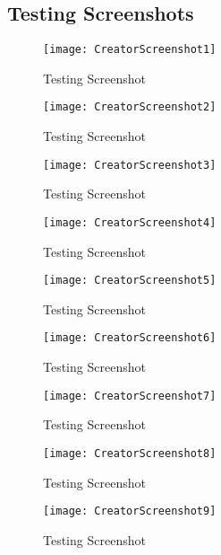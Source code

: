 \documentclass[a4paper, 11pt]{article}
\begin{document}
\begin{appendix}

\section{Testing Screenshots}

\begin{multicols}{2}

\begin{figure}[H]
\centering
\texttt{[image: CreatorScreenshot1]}
\caption{Testing Screenshot}
\label{CreatorScreenshot1}
\end{figure}

\begin{figure}[H]
\centering
\texttt{[image: CreatorScreenshot2]}
\caption{Testing Screenshot}
\label{CreatorScreenshot2}
\end{figure}

\begin{figure}[H]
\centering
\texttt{[image: CreatorScreenshot3]}
\caption{Testing Screenshot}
\label{CreatorScreenshot3}
\end{figure}

\begin{figure}[H]
\centering
\texttt{[image: CreatorScreenshot4]}
\caption{Testing Screenshot}
\label{CreatorScreenshot4}
\end{figure}

\begin{figure}[H]
\centering
\texttt{[image: CreatorScreenshot5]}
\caption{Testing Screenshot}
\label{CreatorScreenshot5}
\end{figure}

\begin{figure}[H]
\centering
\texttt{[image: CreatorScreenshot6]}
\caption{Testing Screenshot}
\label{CreatorScreenshot6}
\end{figure}

\begin{figure}[H]
\centering
\texttt{[image: CreatorScreenshot7]}
\caption{Testing Screenshot}
\label{CreatorScreenshot7}
\end{figure}

\begin{figure}[H]
\centering
\texttt{[image: CreatorScreenshot8]}
\caption{Testing Screenshot}
\label{CreatorScreenshot8}
\end{figure}

\begin{figure}[H]
\centering
\texttt{[image: CreatorScreenshot9]}
\caption{Testing Screenshot}
\label{CreatorScreenshot9}
\end{figure}


\end{multicols}
\end{appendix}
\end{document}

